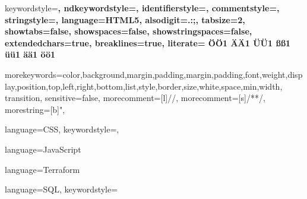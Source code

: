  {%
  keywordstyle=\color{lightblack}\bfseries,
  ndkeywordstyle=\color{lightblack}\bfseries,
  identifierstyle=\color{lightblack},
  commentstyle=\color{green}\ttfamily,
  stringstyle=\color{darkred}\ttfamily,
  language=HTML5,
  alsodigit={.:;},	
  tabsize=2,
  showtabs=false,
  showspaces=false,
  showstringspaces=false,
  extendedchars=true,
  breaklines=true,
  literate=%
  {Ö}{{\"O}}1
  {Ä}{{\"A}}1
  {Ü}{{\"U}}1
  {ß}{{\ss}}1
  {ü}{{\"u}}1
  {ä}{{\"a}}1
  {ö}{{\"o}}1
}

{morekeywords={color,background,margin,padding,margin,padding,font,weight,display,position,top,left,right,bottom,list,style,border,size,white,space,min,width, 	transition}, 
	sensitive=false, 
	morecomment=[l]{//}, 
	morecomment=[s]{/*}{*/}, 
	morestring=[b]", 
}

 {%
  language=CSS,
  keywordstyle=\color{lightblack},
}

 {
  language=JavaScript
}

 {
  language=Terraform
}

 {
  language=SQL,
  keywordstyle=\color{azure}  
}
